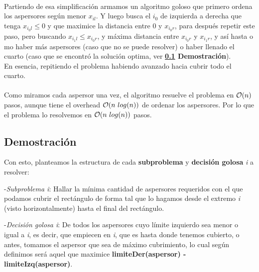 \documentclass[./main.tex]{subfiles}
\begin{document}

\paragraph{} Partiendo de esa simplificación armamos un algoritmo goloso que primero ordena los aspersores según menor \(x_{il}\). Y luego busca el \(i_0\) de izquierda a derecha que tenga \(x_{i_0l} \leq 0\) y que maximice la distancia entre 0 y \(x_{i_0r}\), para después repetir este paso, pero buscando \(x_{i_1l} \leq x_{i_0r}\), y máxima distancia entre \(x_{i_0r}\) y \(x_{i_1r}\), y así hasta o mo haber más aspersores (caso que no se puede resolver) o haber llenado el cuarto (caso que se encontró la solución optima, ver \textbf{\ref{sec:ej2-dem} Demostración}). \\
En esencia, repitiendo el problema habiendo avanzado hacia cubrir todo el cuarto.

\paragraph{} Como miramos cada aspersor una vez, el algoritmo resuelve el problema en \(\mathcal{O}(n)\) pasos, aunque tiene el overhead \(\mathcal{O}(n\ log(n))\) de ordenar los aspersores. Por lo que el problema lo resolvemos en \(\mathcal{O}(n\ log(n))\) pasos. %

\subsection{Demostración}
\label{sec:ej2-dem}


Con esto, planteamos la estructura de cada \textbf{subproblema} y \textbf{decisión golosa} \textit{i} a resolver: \newline

-\textit{Subproblema i}: Hallar la mínima cantidad de aspersores requeridos con el que podamos cubrir el  rectángulo de forma tal que lo hagamos desde el extremo \textit{i} (visto horizontalmente) hasta el final del rectángulo.\newline

-\textit{Decisión golosa i}: De todos los aspersores cuyo límite izquierdo sea menor o igual a \textit{i}, es decir, que empiecen en \textit{i}, que es hasta donde tenemos cubierto, o antes, tomamos el aspersor que sea de máximo cubrimiento, lo cual según definimos será aquel que maximice \textbf{limiteDer(aspersor) - limiteIzq(aspersor)}. \newline
\end{document}
